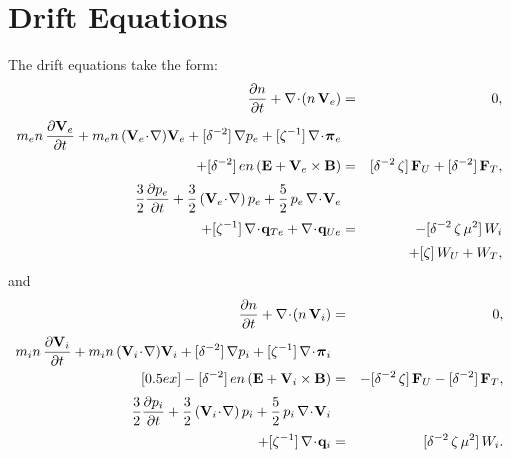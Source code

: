 \section{Drift Equations}\label{s3.12}
The drift equations take the form:
\begin{eqnarray}
\frac{\partial n}{\partial t} + \nabla\!\cdot\!(n\,{\bf V}_e) &=& 0,\label{e3.151a}\\[0.5ex]
m_e n\,\frac{\partial  {\bf V}_e}{\partial t} +
m_e n\,({\bf V}_e\!\cdot\!\nabla){\bf V}_e+
 [\delta^{-2}]\,\nabla p_e+
[\zeta^{-1}]\, \nabla\!\cdot \!\bpi_e &&\label{e3.151b}\\[0.5ex]
 +[\delta^{-2}]\,e n\,
({\bf E} + {\bf V}_e\times {\bf B})& =&[\delta^{-2}\,\zeta]\, {\bf F}_U + [\delta^{-2}]\,
{\bf F}_T,\nonumber\\[0.5ex]
\frac{3}{2}\frac{\partial  p_e}{\partial t} + \frac{3}{2}
 \,({\bf V}_e\!\cdot\!\nabla)\, p_e 
+ \frac{5}{2}\,p_e\,\nabla\!\cdot\!{\bf V}_e&&\\[0.5ex]
+ [\zeta^{-1}]\,\nabla\!\cdot\!{\bf q}_{Te} +\nabla\!\cdot\!{\bf q}_{Ue}  &=&-[\delta^{-2}\,\zeta\,\mu^2]\,
 W_i\nonumber\\[0.5ex]
&&+ [\zeta]\,W_U + W_T,\nonumber\label{e3.151c}
\end{eqnarray}
and
\begin{eqnarray}\label{e3.152a}
\frac{\partial n}{\partial t} +\nabla\!\cdot\!(n\,{\bf V}_i) &=& 0,\\[0.5ex]
m_i n\,\frac{\partial  {\bf V}_i}{\partial t} +
m_i n\,({\bf V}_i\!\cdot\!\nabla) {\bf V}_i +
 [\delta^{-2}]\,\nabla p_i + 
[\zeta^{-1}]\,\nabla\!\cdot \!\bpi_i &&\\\label{e3.152b}[0.5ex]
- [\delta^{-2}]\,e n\,
({\bf E} + {\bf V}_i\times {\bf B})& =&-[\delta^{-2}\,\zeta]\, {\bf F}_U - [\delta^{-2}]\,{\bf F}_T,
\nonumber\\[0.5ex]
\frac{3}{2}\frac{\partial  p_i}{\partial t} +   \frac{3}{2}
 \,({\bf V}_i\!\cdot\!\nabla) \,p_i
+ \frac{5}{2}\,p_i\,\nabla\!\cdot\!{\bf V}_i\\[0.5ex]
+ [\zeta^{-1}]\,\nabla\!\cdot\!{\bf q}_i &=& [\delta^{-2}\,\zeta\,\mu^2]\,W_i.
\nonumber\label{e3.152c}
\end{eqnarray}

